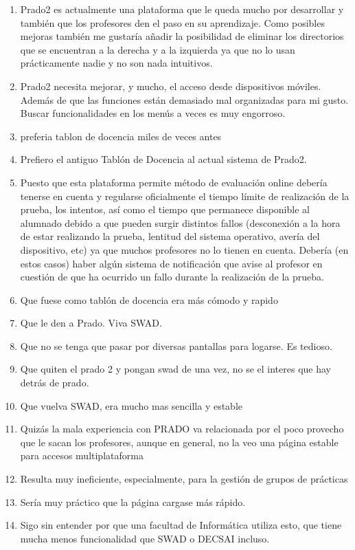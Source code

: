 \begin{enumerate}
\item Prado2 es actualmente una plataforma que le queda mucho por desarrollar y también que los profesores den el paso en su aprendizaje. Como posibles mejoras también me gustaría añadir la posibilidad de eliminar los directorios que se encuentran a la derecha y a la izquierda ya que no lo usan prácticamente nadie y no son nada intuitivos.
\item Prado2 necesita mejorar, y mucho, el acceso desde dispositivos móviles. Además de que las funciones están demasiado mal organizadas para mi gusto. Buscar funcionalidades en los menús a veces es muy engorroso.
\item preferia tablon de docencia miles de veces antes
\item Prefiero el antiguo Tablón de Docencia al actual sistema de Prado2.
\item Puesto que esta plataforma permite método de evaluación online debería tenerse en cuenta y regularse oficialmente el tiempo límite de realización de la prueba, los intentos, así como el tiempo que permanece disponible al alumnado debido a que pueden surgir distintos fallos (desconexión a la hora de estar realizando la prueba, lentitud del sistema operativo, avería del dispositivo, etc) ya que muchos profesores no lo tienen en cuenta. Debería (en estos casos) haber algún sistema de notificación que avise al profesor en cuestión de que ha ocurrido un fallo durante la realización de la prueba.
\item Que fuese como tablón de docencia era más cómodo y rapido
\item Que le den a Prado. Viva SWAD.
\item Que no se tenga que pasar por diversas pantallas para logarse. Es tedioso.
\item Que quiten el prado 2 y pongan swad de una vez, no se el interes que hay detrás de prado.
\item Que vuelva SWAD, era mucho mas sencilla y estable
\item Quizás la mala experiencia con PRADO va relacionada por el poco provecho que le sacan los profesores, aunque en general, no la veo una página estable para accesos multiplataforma
\item Resulta muy ineficiente, especialmente, para la gestión de grupos de prácticas
\item Sería muy práctico que la página cargase más rápido.
\item Sigo sin entender por que una facultad de Informática utiliza esto, que tiene mucha menos funcionalidad que SWAD o DECSAI incluso.

\end{enumerate}
